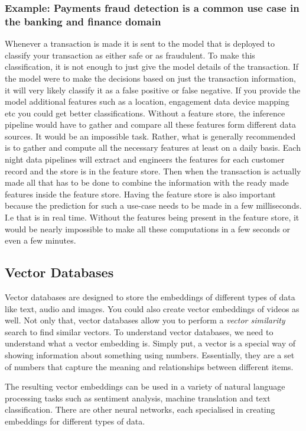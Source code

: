 \documentclass[a4paper, 11pt]{book}
\begin{document}
    \subsubsection{Example: Payments fraud detection is a common use case in the banking and finance domain}
    Whenever a transaction is made it is sent to the model that is deployed to classify your transaction as either safe or as fraudulent.
    To make this classification, it is not enough to just give the model details of the transaction.
    If the model were to make the decisions based on just the transaction information, it will very likely classify it as a false positive or false negative.
    If you provide the model additional features such as a location, engagement data device mapping etc you could get better classifications.
    Without a feature store, the inference pipeline would have to gather and compare all these features form different data sources.
    It would be an impossible task.
    Rather, what is generally recommended is to gather and compute all the necessary features at least on a daily basis.
    Each night data pipelines will extract and engineers the features for each customer record and the store is in the feature store.
    Then when the transaction is actually made all that has to be done to combine the information with the ready made features inside the feature store.
    Having the feature store is also important because the prediction for such a use-case needs to be made in a few milliseconds.
    I.e that is in real time.
    Without the features being present in the feature store, it would be nearly impossible to make all these computations in a few seconds or even a few minutes.

    \subsection{Vector Databases}
    Vector databases are designed to store the embeddings of different types of data like text, audio and images.
    You could also create vector embeddings of videos as well.
    Not only that, vector databases allow you to perform a \textit{vector similarity} search to find similar vectors.
    To understand vector databases, we need to understand what a vector embedding is.
    Simply put, a vector is a special way of showing information about something using numbers.
    Essentially, they are a set of numbers that capture the meaning and relationships between different items.

    The resulting vector embeddings can be used in a variety of natural language processing tasks such as sentiment analysis, machine translation and text classification.
    There are other neural networks, each specialised in creating embeddings for different types of data.
\end{document}
